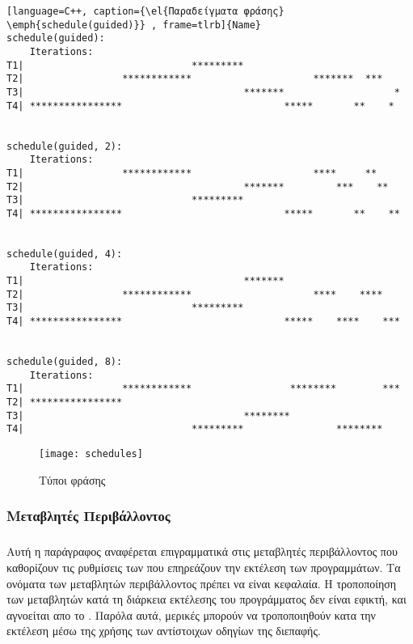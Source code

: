 \begin{lstlisting}[language=C++, caption={\el{Παραδείγματα φράσης} \emph{schedule(guided)}} , frame=tlrb]{Name}
schedule(guided):
    Iterations:       
T1|                             *********                       
T2|                 ************                     *******  ***   
T3|                                      *******                   *
T4| ****************                            *****       **    * 


schedule(guided, 2): 
    Iterations:
T1|                 ************                     ****     **    
T2|                                      *******         ***    **  
T3|                             *********                           
T4| ****************                            *****       **    **


schedule(guided, 4):   
    Iterations:
T1|                                      *******                    
T2|                 ************                     ****    ****   
T3|                             *********                           
T4| ****************                            *****    ****    ***


schedule(guided, 8):   
    Iterations:
T1|                 ************                 ********        ***
T2| ****************                                                
T3|                                      ********                   
T4|                             *********                ********
\end{lstlisting}
     
       
       \begin{figure}[h]
\texttt{[image: schedules]}
\centering
\captionsetup{justification=centering, singlelinecheck=false}
	\caption{Τύποι φράσης }
\label{fig:schedules}
\end{figure}


\subsubsection{Μεταβλητές Περιβάλλοντος}
\subparagraph{}
Αυτή η παράγραφος αναφέρεται επιγραμματικά στις μεταβλητές περιβάλλοντος που καθορίζουν τις ρυθμίσεις των \emph{} που επηρεάζουν την εκτέλεση των προγραμμάτων. Τα ονόματα των μεταβλητών περιβάλλοντος πρέπει να είναι κεφαλαία. Η τροποποίηση των μεταβλητών κατά τη διάρκεια εκτέλεσης του προγράμματος δεν είναι εφικτή, και αγνοείται απο το \emph{}. Παρόλα αυτά, μερικές μπορούν να τροποποιηθούν κατα την εκτέλεση μέσω της χρήσης των αντίστοιχων οδηγίων της διεπαφής\cite{environmental_var}.

